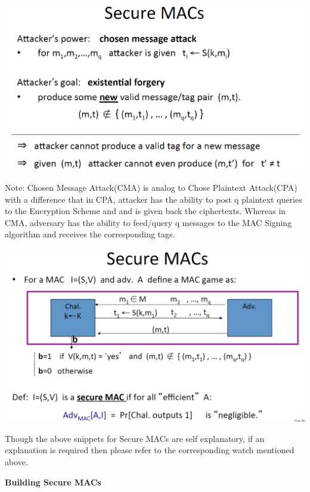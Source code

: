 \documentclass[11pt]{article}
\makeatletter
\def\maxwidth{\ifdim\Gin@nat@width>\linewidth\linewidth
    \else\Gin@nat@width\fi}
\let\Oldincludegraphics\includegraphics
\renewcommand{\includegraphics}[1]{\Oldincludegraphics[width=.8\maxwidth]{#1}}
\makeatother
\begin{document}
\includegraphics{./Images/SecureMAC.png}

Note: Chosen Message Attack(CMA) is analog to Chose Plaintext
Attack(CPA) with a difference that in CPA, attacker has the ability to
post q plaintext queries to the Encryption Scheme and and is given back
the ciphertexts. Whereas in CMA, adversary has the ability to feed/query
q messages to the MAC Signing algorithm and receives the corresponding
tags.

\includegraphics{./Images/SecureMAC-2.png}

Though the above snippets for Secure MACs are self explanatory, if an
explanation is required then please refer to the corresponding watch
mentioned above.

\textbf{Building Secure MACs}
\end{document}
